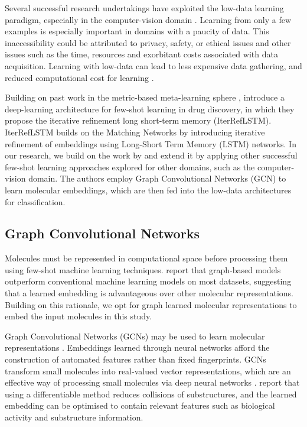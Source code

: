 \documentclass[journal=jcisd8,manuscript=article]{achemso} %
\begin{document}
Several successful research undertakings have exploited the low-data learning paradigm, especially in the computer-vision domain \cite{koch2015siamese, vinyals2016matching, snell2017prototypical, sung2018learning}. Learning from only a few examples is especially important in domains with a paucity of data. This inaccessibility could be attributed to privacy, safety, or ethical issues and other issues such as the time, resources and exorbitant costs associated with data acquisition. Learning with low-data can lead to less expensive data gathering, and reduced computational cost for learning \cite{wang2020generalizing}.

Building on past work in the metric-based meta-learning sphere \cite{vinyals2016matching}, \citet{altae2017low} introduce a deep-learning architecture for few-shot learning in drug discovery, in which they propose the iterative refinement long short-term memory (IterRefLSTM). IterRefLSTM builds on the Matching Networks \cite{vinyals2016matching} by introducing iterative refinement of embeddings using Long-Short Term Memory (LSTM) networks. In our research, we build on the work by \citet{altae2017low} and extend it by applying other successful few-shot learning approaches explored for other domains, such as the computer-vision domain. The authors employ Graph Convolutional Networks (GCN) to learn molecular embeddings, which are then fed into the low-data architectures for classification.

\subsection{Graph Convolutional Networks}

Molecules must be represented in computational space before processing them using few-shot machine learning techniques. \citet{wu2018moleculenet} report that graph-based models outperform conventional machine learning models on most datasets, suggesting that a learned embedding is advantageous over other molecular representations. Building on this rationale, we opt for graph learned molecular representations to embed the input molecules in this study. 

Graph Convolutional Networks (GCNs) may be used to learn molecular representations \cite{jiang2021could}. Embeddings learned through neural networks afford the construction of automated features rather than fixed fingerprints. GCNs transform small molecules into real-valued vector representations, which are an effective way of processing small molecules via deep neural networks \cite{gomez2018automatic}. \citet{duvenaud2015convolutional} report that using a differentiable method reduces collisions of substructures, and the learned embedding can be optimised to contain relevant features such as biological activity and substructure information.
\end{document}
